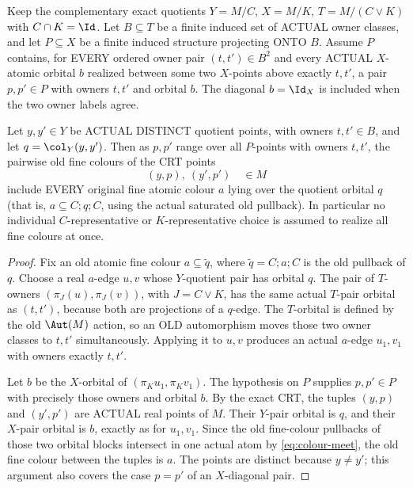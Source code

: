 \begin{lemma}
\label{lem:acf-complementary-spectrum}
Keep the complementary exact quotients
\(Y=M/C\), \(X=M/K\), \(T=M/(C\vee K)\)
with \(C\cap K=\Id\). Let
\(B\subseteq T\) be a finite induced
set of ACTUAL owner classes, and let
\(P\subseteq X\) be a finite induced
structure projecting ONTO \(B\).
Assume \(P\) contains, for EVERY
ordered owner pair \((t,t')\in B^2\)
and every ACTUAL \(X\)-atomic orbital
\(b\) realized between some two
\(X\)-points above exactly \(t,t'\),
a pair \(p,p'\in P\) with owners
\(t,t'\) and orbital \(b\).
The diagonal \(b=\Id_X\) is included
when the two owner labels agree.

Let \(y,y'\in Y\) be ACTUAL DISTINCT
quotient points, with owners
\(t,t'\in B\), and let
\(q=\col_Y(y,y')\). Then as \(p,p'\)
range over all \(P\)-points with
owners \(t,t'\), the pairwise old
fine colours of the CRT points
\[
               (y,p),\ (y',p')
                   \quad\in M
\]
include EVERY original fine atomic
colour \(a\) lying over the quotient
orbital \(q\) (that is,
\(a\subseteq C;q;C\), using the
actual saturated old pullback).
In particular no individual
\(C\)-representative or \(K\)-representative
choice is assumed to realize all fine
colours at once.
\end{lemma}
\begin{proof}
Fix an old atomic fine colour
\(a\subseteq\widetilde q\), where
\(\widetilde q=C;a;C\) is the old
pullback of \(q\).
Choose a real \(a\)-edge
\(u,v\) whose \(Y\)-quotient
pair has orbital \(q\).
The pair of \(T\)-owners
\((\pi_J(u),\pi_J(v))\), with
\(J=C\vee K\), has the same
actual \(T\)-pair orbital as
\((t,t')\), because both are
projections of a \(q\)-edge.
The \(T\)-orbital is defined by
the old \(\Aut(M)\) action, so
an OLD automorphism moves
those two owner classes to
\(t,t'\) simultaneously.
Applying it to \(u,v\)
produces an actual \(a\)-edge
\(u_1,v_1\) with owners
exactly \(t,t'\).

Let \(b\) be the \(X\)-orbital
of \((\pi_Ku_1,\pi_Kv_1)\).
The hypothesis on \(P\)
supplies \(p,p'\in P\)
with precisely those owners
and orbital \(b\).
By the exact CRT, the tuples
\((y,p)\) and \((y',p')\)
are ACTUAL real points of \(M\).
Their \(Y\)-pair orbital is
\(q\), and their \(X\)-pair
orbital is \(b\), exactly as
for \(u_1,v_1\). Since
the old fine-colour pullbacks
of those two orbital blocks
intersect in one actual atom
by \eqref{eq:colour-meet},
the old fine colour between
the tuples is \(a\).
The points are distinct because
\(y\ne y'\); this argument
also covers the case \(p=p'\)
of an \(X\)-diagonal pair.
\end{proof}

